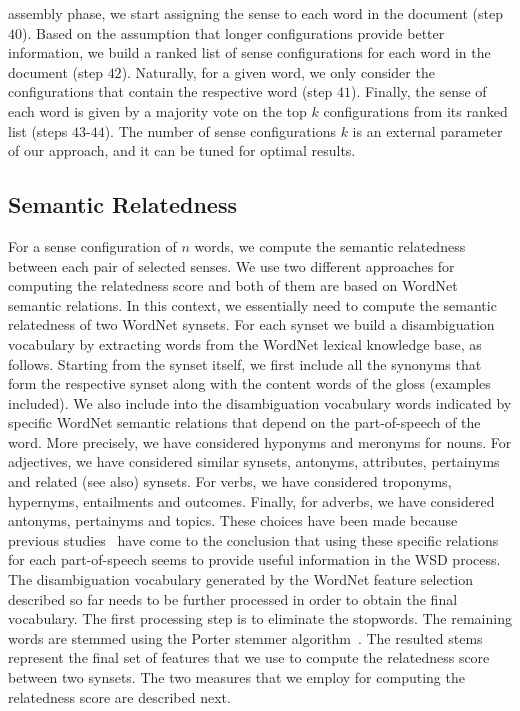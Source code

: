 \documentclass[11pt]{article}
\begin{document}
assembly phase, we start assigning the sense to each word in the document (step $40$). Based on the assumption that longer configurations provide better information, we build a ranked list of sense configurations for each word in the document (step $42$). Naturally, for a given word, we only consider the configurations that contain the respective word (step $41$). Finally, the sense of each word is given by a majority vote on the top $k$ configurations from its ranked list (steps $43$-$44$). The number of sense configurations $k$ is an external parameter of our approach, and it can be tuned for optimal results.
 
\subsection{Semantic Relatedness}
\label{sec_SemanticRelatedness} 

For a sense configuration of $n$ words, we compute the semantic relatedness between each pair of selected senses. We use two different approaches for computing the relatedness score and both of them are based on WordNet semantic relations. In this context, we essentially need to compute the semantic relatedness of two WordNet synsets. For each synset we build a disambiguation vocabulary by extracting words from the WordNet lexical knowledge base, as follows. Starting from the synset itself, we first include all the synonyms that form the respective synset along with the content words of the gloss (examples included). We also include into the disambiguation vocabulary words indicated by specific WordNet semantic relations that depend on the part-of-speech of the word. More precisely, we have considered hyponyms and meronyms for nouns. For adjectives, we have considered similar synsets, antonyms, attributes, pertainyms and related (see also) synsets. For verbs, we have considered troponyms, hypernyms, entailments and outcomes. Finally, for adverbs, we have considered antonyms, pertainyms and topics. These choices have been made because previous studies~\cite{Banerjee-IJCAI-2003,Hristea-2008} have come to the conclusion that using these specific relations for each part-of-speech seems to provide useful information in the WSD process. The disambiguation vocabulary generated by the WordNet feature selection described so far needs to be further processed in order to obtain the final vocabulary. The first processing step is to eliminate the stopwords. The remaining words are stemmed using the Porter stemmer algorithm~\cite{Porter-1980}. The resulted stems represent the final set of features that we use to compute the relatedness score between two synsets. The two measures that we employ for computing the relatedness score are described next. 
\end{document}
